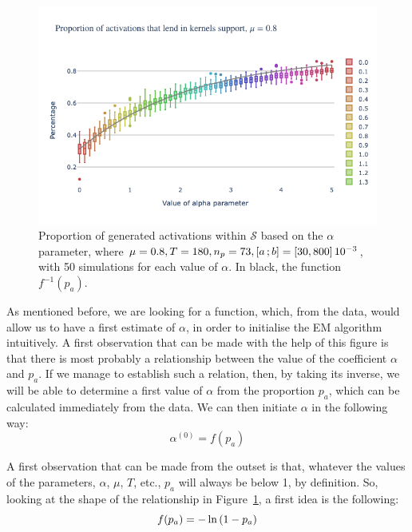 \begin{figure}[h!]
    \centering
    \includegraphics[scale=0.6]{pics/ppt_in_support_transp.png}
    \caption{Proportion of generated activations within $\mathcal{S}$ based on the $\alpha$ parameter, where $\mu=0.8, T=180, n_p=73, \left[ a \, ; b \right]=\left\lbrack 30, 800 \right\rbrack \num{e-3}$, with 50 simulations for each value of $\alpha$. In black, the function $f^{-1}(p_a)$.}
    \label{fig:ppt_in_support}
\end{figure}

As mentioned before, we are looking for a function, which, from the data, would allow us to have a first estimate of $\alpha$, in order to initialise the EM algorithm intuitively.
A first observation that can be made with the help of this figure is that there is most probably a relationship between the value of the coefficient $\alpha$ and $p_a$.
If we manage to establish such a relation, then, by taking its inverse, we will be able to determine a first value of $\alpha$ from the proportion $p_a$, which can be calculated immediately from the data.
We can then initiate $\alpha$ in the following way:
\begin{equation}
    \alpha^{(0)} = f(p_a)
\end{equation}

A first observation that can be made from the outset is that, whatever the values of the parameters, $\alpha$, $\mu$, $T$, etc., $p_a$ will always be below 1, by definition.
So, looking at the shape of the relationship in Figure~\ref{fig:ppt_in_support}, a first idea is the following:
\begin{equation}\label{eq:alpha_init_1}
    f(p_a) = -\ln \left( 1-p_a \right)
\end{equation}

